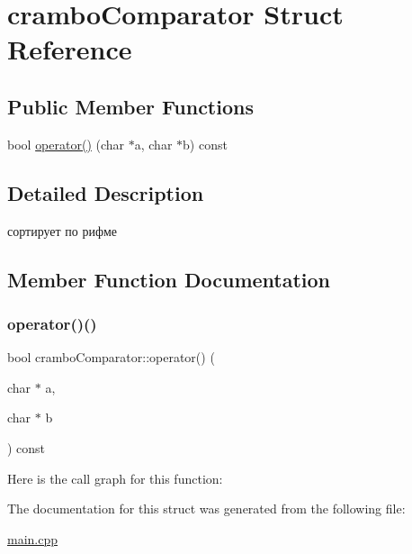 \hypertarget{structcrambo_comparator}{}\section{crambo\+Comparator Struct Reference}
\label{structcrambo_comparator}
\subsection*{Public Member Functions}
\begin{DoxyCompactItemize}
\item 
bool \mbox{\hyperlink{structcrambo_comparator_a03ab956b31df97d8c4b705134ef3457d}{operator()}} (char $\ast$a, char $\ast$b) const
\end{DoxyCompactItemize}


\subsection{Detailed Description}
сортирует по рифме 

\subsection{Member Function Documentation}
\mbox{\label{structcrambo_comparator_a03ab956b31df97d8c4b705134ef3457d}} 
\subsubsection{\texorpdfstring{operator()()}{operator()()}}
{\footnotesize\ttfamily bool crambo\+Comparator\+::operator() (\begin{DoxyParamCaption}\item[{char $\ast$}]{a,  }\item[{char $\ast$}]{b }\end{DoxyParamCaption}) const\hspace{0.3cm}{\ttfamily [inline]}}

Here is the call graph for this function\+:


The documentation for this struct was generated from the following file\+:\begin{DoxyCompactItemize}
\item 
\mbox{\hyperlink{main_8cpp}{main.\+cpp}}\end{DoxyCompactItemize}
